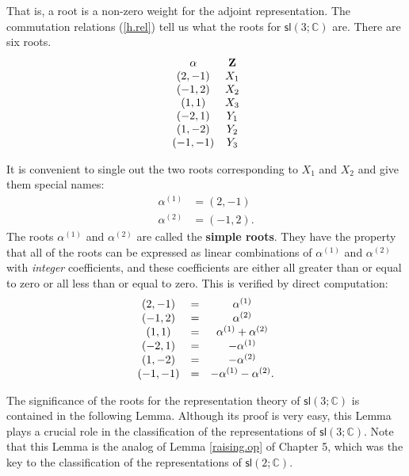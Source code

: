 \documentclass[12pt]{amsbook}
\theoremstyle{plain}
\numberwithin{equation}{chapter}
\numberwithin{theorem}{chapter}
\begin{document}
That is, a root is a non-zero weight for the adjoint representation. The
commutation relations (\ref{h.rel}) tell us what the roots for $\mathsf{sl}%
\left(  3;\mathbb{C}\right)  $ are. There are six roots.
\begin{equation}%
\begin{array}
[c]{cc}%
\mathbf{\alpha} & \mathbf{Z}\\
\left(  2,-1\right)  & X_{1}\\
(-1,2) & X_{2}\\
(1,1) & X_{3}\\
(-2,1) & Y_{1}\\
(1,-2) & Y_{2}\\
(-1,-1) & Y_{3}%
\end{array}
\label{the.roots}%
\end{equation}

It is convenient to single out the two roots corresponding to $X_{1}$ and
$X_{2}$ and give them special names:
\begin{align}
\alpha^{(1)}  & =\left(  2,-1\right) \nonumber\\
\alpha^{(2)}  & =(-1,2)\text{.}\label{simple.roots}%
\end{align}
The roots $\alpha^{(1)}$ and $\alpha^{(2)}$ are called the \textbf{simple
roots}. They have the property that all of the roots can be expressed as
linear combinations of $\alpha^{(1)}$ and $\alpha^{(2)}$ with \textit{integer}
coefficients, and these coefficients are either all greater than or equal to
zero or all less than or equal to zero. This is verified by direct
computation:
\[%
\begin{array}
[c]{ccc}%
(2,-1) & = & \alpha^{(1)}\\
(-1,2) & = & \alpha^{(2)}\\
(1,1) & = & \alpha^{(1)}+\alpha^{(2)}\\
(-2,1) & = & -\alpha^{(1)}\\
(1,-2) & = & -\alpha^{(2)}\\
(-1,-1) & = & -\alpha^{(1)}-\alpha^{(2)}\text{.}%
\end{array}
\]

The significance of the roots for the representation theory of $\mathsf{sl}%
\left(  3;\mathbb{C}\right)  $ is contained in the following Lemma. Although
its proof is very easy, this Lemma plays a crucial role in the classification
of the representations of $\mathsf{sl}\left(  3;\mathbb{C}\right)  $. Note
that this Lemma is the analog of Lemma \ref{raising.op} of Chapter 5, which
was the key to the classification of the representations of $\mathsf{sl}%
(2;\mathbb{C})$.
\end{document}
